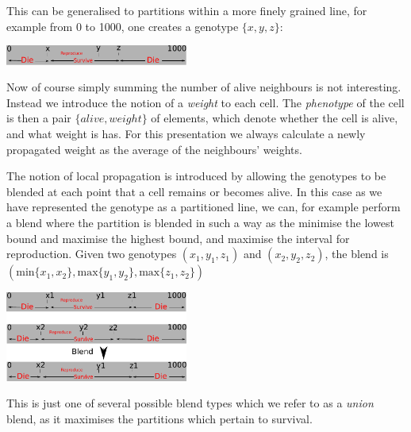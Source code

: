 \documentclass{AISB2008}
\begin{document}
This can be generalised to partitions within a more finely grained
line, for example from 0 to 1000, one creates a genotype $\{x,y,z\}$:
\begin{center}
\includegraphics[width=0.45\textwidth]{2dgenotype.pdf}
\end{center}
Now of course simply summing the number of alive neighbours is
not interesting. Instead we introduce the notion of a {\em weight} to
each cell. The {\em phenotype} of the cell is then a pair $\{alive, weight\}$ of elements, which denote whether the cell is alive, and what weight is has. For this presentation we always calculate a newly propagated weight as the average of the neighbours' weights.


The notion of local propagation is introduced by allowing the
genotypes to be blended at each point that a cell remains or becomes
alive. In this case as we have represented the genotype as a
partitioned line, we can, for example perform a blend where the
partition is blended in such a way as the minimise the lowest bound
and maximise the highest bound, and maximise the interval for
reproduction. Given two genotypes $(x_1, y_1,
z_1)$ and $(x_2, y_2, z_2)$, the blend is $(\mathrm{min} \{x_1,x_2\},
\mathrm{max} \{y_1,y_2\}, \mathrm{max} \{z_1,z_2\})$
\begin{center}
\includegraphics[width=0.45\textwidth]{2dgenotypeblend.pdf}
\end{center}
This is just one of several possible blend types which we refer to as a {\em union} blend, as it maximises the partitions which pertain to survival. 
\end{document}
